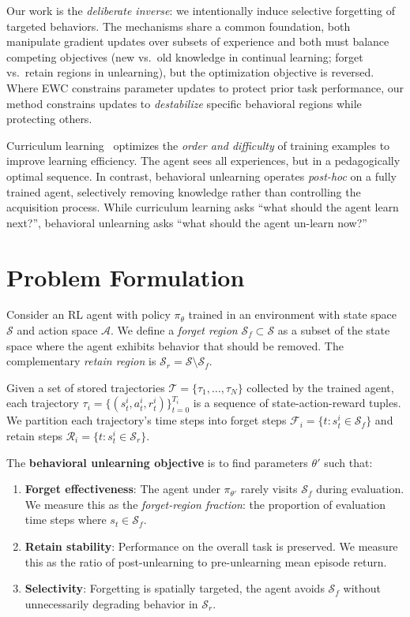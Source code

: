 \documentclass[sigconf]{acmart}
\begin{document}
Our work is the \emph{deliberate inverse}: we intentionally induce selective forgetting of targeted behaviors. The mechanisms share a common foundation, both manipulate gradient updates over subsets of experience and both must balance competing objectives (new vs.\ old knowledge in continual learning; forget vs.\ retain regions in unlearning), but the optimization objective is reversed. Where EWC constrains parameter updates to protect prior task performance, our method constrains updates to \emph{destabilize} specific behavioral regions while protecting others.

Curriculum learning~\cite{bengio2009curriculum} optimizes the \emph{order and difficulty} of training examples to improve learning efficiency. The agent sees all experiences, but in a pedagogically optimal sequence. In contrast, behavioral unlearning operates \emph{post-hoc} on a fully trained agent, selectively removing knowledge rather than controlling the acquisition process. While curriculum learning asks ``what should the agent learn next?'', behavioral unlearning asks ``what should the agent un-learn now?''

\section{Problem Formulation}

Consider an RL agent with policy $\pi_\theta$ trained in an environment with state space $\mathcal{S}$ and action space $\mathcal{A}$. We define a \emph{forget region} $\mathcal{S}_f \subset \mathcal{S}$ as a subset of the state space where the agent exhibits behavior that should be removed. The complementary \emph{retain region} is $\mathcal{S}_r = \mathcal{S} \setminus \mathcal{S}_f$.

Given a set of stored trajectories $\mathcal{T} = \{\tau_1, \ldots, \tau_N\}$ collected by the trained agent, each trajectory $\tau_i = \{(s_t^i, a_t^i, r_t^i)\}_{t=0}^{T_i}$ is a sequence of state-action-reward tuples. We partition each trajectory's time steps into forget steps $\mathcal{F}_i = \{t : s_t^i \in \mathcal{S}_f\}$ and retain steps $\mathcal{R}_i = \{t : s_t^i \in \mathcal{S}_r\}$.

The \textbf{behavioral unlearning objective} is to find parameters $\theta'$ such that:
\begin{enumerate}
    \item \textbf{Forget effectiveness}: The agent under $\pi_{\theta'}$ rarely visits $\mathcal{S}_f$ during evaluation. We measure this as the \emph{forget-region fraction}: the proportion of evaluation time steps where $s_t \in \mathcal{S}_f$.
    \item \textbf{Retain stability}: Performance on the overall task is preserved. We measure this as the ratio of post-unlearning to pre-unlearning mean episode return.
    \item \textbf{Selectivity}: Forgetting is spatially targeted, the agent avoids $\mathcal{S}_f$ without unnecessarily degrading behavior in $\mathcal{S}_r$.
\end{enumerate}
\end{document}
